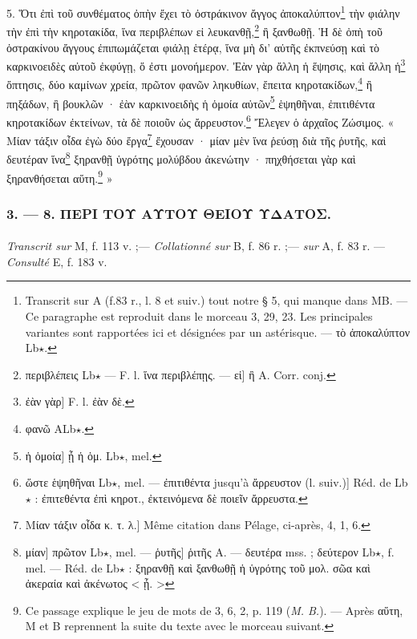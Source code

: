 \documentclass[landscape, a4paper, 11pt, oneside, polutonikogreek, french]{article}
\begin{document}
5. Ὅτι ἐπὶ τοῦ συνθέματος ὀπὴν ἔχει τὸ ὀστράκινον ἄγγος ἀποκαλύπτον\footnote{Transcrit sur A (f.83 r., l. 8 et suiv.) tout notre § 5, qui manque dans MB. --- Ce paragraphe est reproduit dans le morceau 3, 29, 23. Les principales variantes sont rapportées ici et désignées par un astérisque. --- τὸ ἀποκαλύπτον Lb$\star$.} τὴν φιάλην τὴν ἐπὶ τὴν κηροτακίδα, ἵνα περιβλέπων εἰ λευκανθῇ,\footnote{περιβλέπεις Lb$\star$ --- F. l. ἵνα περιβλέπῃς. --- εἰ] ἢ A. Corr. conj.} ἢ ξανθωθῇ. Ἡ δὲ ὀπὴ τοῦ ὀστρακίνου ἄγγους ἐπιπωμάζεται φιάλῃ ἑτέρᾳ, ἵνα μὴ δι' αὐτῆς ἐκπνεύσῃ καὶ τὸ καρκινοειδὲς αὐτοῦ ἐκφύγῃ, ὅ ἐστι μονοήμερον. Ἐὰν γὰρ ἄλλη ἡ ἕψησις, καὶ ἄλλη ἡ\footnote{ἐὰν γὰρ] F. l. ἐὰν δὲ.} ὄπτησις, δύο καμίνων χρεία, πρῶτον φανῶν ληκυθίων, ἔπειτα κηροτακίδων,\footnote{φανῶ ALb$\star$.} ἢ πηξάδων, ἢ βουκλῶν · ἐὰν καρκινοειδὴς ἡ ὁμοία αὐτῶν\footnote{ἡ ὁμοία] ᾖ ἡ ὁμ. Lb$\star$, mel.} ἑψηθῆναι, ἐπιτιθέντα κηροτακίδων ἐκτείνων, τὰ δὲ ποιοῦν ὡς ἄρρευστον.\footnote{ὥστε ἑψηθῆναι Lb$\star$, mel. --- ἐπιτιθέντα jusqu'à ἄρρευστον (l. suiv.)] Réd. de Lb$\star$ : ἐπιτεθέντα ἐπὶ κηροτ., ἐκτεινόμενα δὲ ποιεῖν ἄρρευστα.} Ἔλεγεν ὁ ἀρχαῖος Ζώσιμος. « Μίαν τάξιν οἶδα ἐγὼ δύο ἔργα\footnote{Mίαν τάξιν οἶδα κ. τ. λ.] Même citation dans Pélage, ci-après, 4, 1, 6.} ἔχουσαν · μίαν μὲν ἵνα ῥεύσῃ διὰ τῆς ῥυτῆς, καὶ δευτέραν ἵνα\footnote{μίαν] πρῶτον Lb$\star$, mel. --- ῥυτῆς] ῥιτῆς A. --- δευτέρα mss. ; δεύτερον Lb$\star$, f. mel. --- Réd. de Lb$\star$ : ξηρανθῇ καὶ ξανθωθῇ ἡ ὑγρότης τοῦ μολ. σῶα καὶ ἀκεραία καὶ ἀκένωτος < ᾖ. >} ξηρανθῇ ὑγρότης μολύβδου ἀκενώτην · πηχθήσεται γὰρ καὶ ξηρανθήσεται αὕτη.\footnote{Ce passage explique le jeu de mots de 3, 6, 2, p. 119 (\emph{M. B.}). --- Après αὕτη, M et B reprennent la suite du texte avec le morceau suivant.} »

\bigskip
\centerline{\EightStarTaper}
\centerline{\EightStarTaper\EightStarTaper}
\bigskip

\subsubsection{3. --- 8. ΠΕΡΙ ΤΟΥ ΑΥΤΟΥ ΘΕΙΟΥ ΥΔΑΤΟΣ.}
\paragraph{}
\emph{Transcrit sur} M, f. 113 v. ;--- \emph{Collationné sur} B, f. 86 r. ;--- \emph{sur} A, f. 83 r. --- \emph{Consulté} E, f. 183 v.

\bigskip
\end{document}
